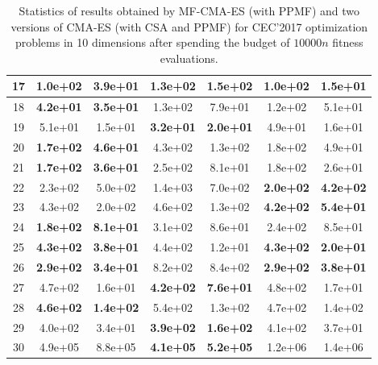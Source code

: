 \begin{table}[t!]
{\begin{tabular}{c|c|c|c|c|c|c}
\hline
17 & \textbf{1.0e+02} & \textbf{3.9e+01} & 1.3e+02 & 1.5e+02 & \textbf{1.0e+02} & \textbf{1.5e+01}\\
\hline
18 & \textbf{4.2e+01} & \textbf{3.5e+01} & 1.3e+02 & 7.9e+01 & 1.2e+02 & 5.1e+01\\
\hline
19 & 5.1e+01 & 1.5e+01 & \textbf{3.2e+01} & \textbf{2.0e+01} & 4.9e+01 & 1.6e+01\\
\hline
20 & \textbf{1.7e+02} & \textbf{4.6e+01} & 4.3e+02 & 1.3e+02 & 1.8e+02 & 4.9e+01\\
\hline
21 & \textbf{1.7e+02} & \textbf{3.6e+01} & 2.5e+02 & 8.1e+01 & 1.8e+02 & 2.6e+01\\
\hline
22 & 2.3e+02 & 5.0e+02 & 1.4e+03 & 7.0e+02 & \textbf{2.0e+02} & \textbf{4.2e+02}\\
\hline
23 & 4.3e+02 & 2.0e+02 & 4.6e+02 & 1.3e+02 & \textbf{4.2e+02} & \textbf{5.4e+01}\\
\hline
24 & \textbf{1.8e+02} & \textbf{8.1e+01} & 3.1e+02 & 8.6e+01 & 2.4e+02 & 8.5e+01\\
\hline
25 & \textbf{4.3e+02} & \textbf{3.8e+01} & 4.4e+02 & 1.2e+01 & \textbf{4.3e+02} & \textbf{2.0e+01}\\
\hline
26 & \textbf{2.9e+02} & \textbf{3.4e+01} & 8.2e+02 & 8.4e+02 & \textbf{2.9e+02} & \textbf{3.8e+01}\\
\hline
27 & 4.7e+02 & 1.6e+01 & \textbf{4.2e+02} & \textbf{7.6e+01} & 4.8e+02 & 1.7e+01\\
\hline
28 & \textbf{4.6e+02} & \textbf{1.4e+02} & 5.4e+02 & 1.3e+02 & 4.7e+02 & 1.4e+02\\
\hline
29 & 4.0e+02 & 3.4e+01 & \textbf{3.9e+02} & \textbf{1.6e+02} & 4.1e+02 & 3.7e+01\\
\hline
30 & 4.9e+05 & 8.8e+05 & \textbf{4.1e+05} & \textbf{5.2e+05} & 1.2e+06 & 1.4e+06\\

\bottomrule
\end{tabular}
}
\caption{Statistics of results obtained by MF-CMA-ES (with PPMF) and two versions of CMA-ES (with CSA and PPMF) for CEC'2017 optimization problems in 10 dimensions after spending the budget of $10000n$ fitness evaluations.}
\label{tab:CEC17-D10}
\end{table}